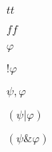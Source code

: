 \documentclass{article}
\begin{document}
$tt$
\pagebreak

$ff$
\pagebreak

$\varphi$
\pagebreak

$!\varphi$
\pagebreak

$\psi, \varphi$
\pagebreak

$(\psi|\varphi)$
\pagebreak

$(\psi\&\varphi)$
\pagebreak
\end{document}
